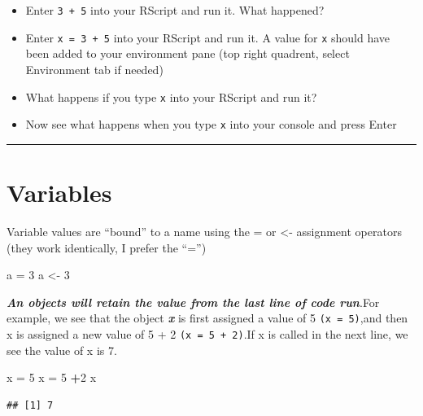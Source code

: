 \documentclass[
]{article}
\newenvironment{Shaded}{\begin{snugshade}}{\end{snugshade}}
\newcommand{\DecValTok}[1]{\textcolor[rgb]{0.00,0.00,0.81}{#1}}
\newcommand{\NormalTok}[1]{#1}
\newcommand{\OperatorTok}[1]{\textcolor[rgb]{0.81,0.36,0.00}{\textbf{#1}}}
\newcommand{\StringTok}[1]{\textcolor[rgb]{0.31,0.60,0.02}{#1}}
\providecommand{\tightlist}{%
  \setlength{\itemsep}{0pt}\setlength{\parskip}{0pt}}
\begin{document}
\begin{itemize}
\tightlist
\item
  Enter \texttt{3\ +\ 5} into your RScript and run it. What happened?
\item
  Enter \texttt{x\ =\ 3\ +\ 5} into your RScript and run it. A value for
  \texttt{x} should have been added to your environment pane (top right
  quadrent, select Environment tab if needed)
\item
  What happens if you type \texttt{x} into your RScript and run it?
\item
  Now see what happens when you type \texttt{x} into your console and
  press Enter
\end{itemize}

\begin{center}\rule{0.5\linewidth}{0.5pt}\end{center}

\hypertarget{variables}{%
\section{\texorpdfstring{\textbf{Variables}}{Variables}}\label{variables}}

Variable values are ``bound'' to a name using the = or \textless-
assignment operators (they work identically, I prefer the ``='')

\begin{Shaded}
\begin{Highlighting}[]
\NormalTok{a =}\StringTok{ }\DecValTok{3}
\NormalTok{a <-}\StringTok{ }\DecValTok{3}
\end{Highlighting}
\end{Shaded}

\textbf{\emph{An objects will retain the value from the last line of
code run}}.For example, we see that the object \textbf{\emph{x}} is
first assigned a value of 5 \texttt{(x\ =\ 5)},and then x is assigned a
new value of 5 + 2 \texttt{(x\ =\ 5\ +\ 2)}.If x is called in the next
line, we see the value of x is 7.

\begin{Shaded}
\begin{Highlighting}[]
\NormalTok{x =}\StringTok{ }\DecValTok{5} 
\NormalTok{x =}\StringTok{ }\DecValTok{5} \OperatorTok{+}\DecValTok{2}
\NormalTok{x}
\end{Highlighting}
\end{Shaded}

\begin{verbatim}
## [1] 7
\end{verbatim}
\end{document}
